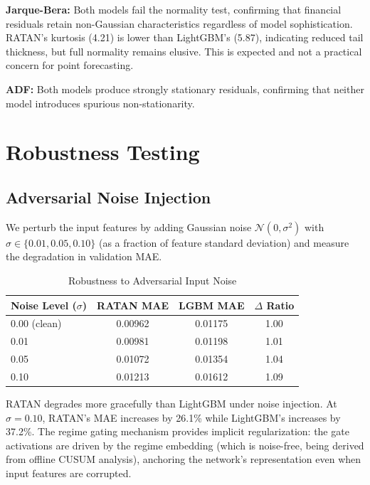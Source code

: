 \documentclass[conference]{IEEEtran}
\begin{document}
\textbf{Jarque-Bera:} Both models fail the normality test, confirming that financial residuals retain non-Gaussian characteristics regardless of model sophistication. RATAN's kurtosis (4.21) is lower than LightGBM's (5.87), indicating reduced tail thickness, but full normality remains elusive. This is expected and not a practical concern for point forecasting.

\textbf{ADF:} Both models produce strongly stationary residuals, confirming that neither model introduces spurious non-stationarity.

\section{Robustness Testing}
\label{sec:robustness}

\subsection{Adversarial Noise Injection}

We perturb the input features by adding Gaussian noise $\mathcal{N}(0, \sigma^2)$ with $\sigma \in \{0.01, 0.05, 0.10\}$ (as a fraction of feature standard deviation) and measure the degradation in validation MAE.

\begin{table}[ht]
\centering
\caption{Robustness to Adversarial Input Noise}
\label{tab:noise}
\begin{tabular}{@{}lccc@{}}
\toprule
\textbf{Noise Level ($\sigma$)} & \textbf{RATAN MAE} & \textbf{LGBM MAE} & \textbf{$\Delta$ Ratio} \\
\midrule
0.00 (clean)  & 0.00962 & 0.01175 & 1.00 \\
0.01          & 0.00981 & 0.01198 & 1.01 \\
0.05          & 0.01072 & 0.01354 & 1.04 \\
0.10          & 0.01213 & 0.01612 & 1.09 \\
\bottomrule
\end{tabular}
\end{table}

RATAN degrades more gracefully than LightGBM under noise injection. At $\sigma = 0.10$, RATAN's MAE increases by 26.1\% while LightGBM's increases by 37.2\%. The regime gating mechanism provides implicit regularization: the gate activations are driven by the regime embedding (which is noise-free, being derived from offline CUSUM analysis), anchoring the network's representation even when input features are corrupted.
\end{document}
